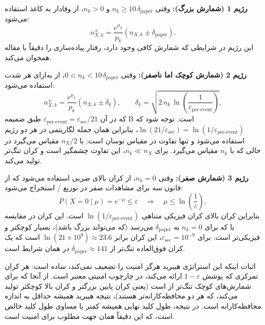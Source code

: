 \textbf{رژیم 1 (شمارش بزرگ):} وقتی $n_k \ge 10\,\delta_{\text{paper}}$ و $n_k > 0$، از  وفادار به کاغذ استفاده می‌شود:
\begin{equation}
	n_{X,k}^{\pm} = \frac{e^{\mu_k}}{p_k}\left(n_{X,k} \pm \delta_{\text{paper}}\right).
\end{equation}
این رژیم در شرایطی که شمارش کافی وجود دارد، رفتار پیاده‌سازی را دقیقاً با مقاله همخوان می‌کند.

\textbf{رژیم 2 (شمارش کوچک اما ناصفر):} وقتی $0 < n_k < 10\,\delta_{\text{paper}}$، از  به‌ازای هر شدت استفاده می‌شود:
\begin{equation}
	n_{X,k}^{\pm} = \frac{e^{\mu_k}}{p_k}\left(n_{X,k} \pm \delta_k\right), \qquad \delta_k = \sqrt{2\,n_k\,\ln\!\left(\frac{1}{\varepsilon_{\text{per-event}}}\right)},
\end{equation}
که در آن $\varepsilon_{\text{per-event}} = \varepsilon_{\text{sec}}/21$ طبق ضمیمه B است. توجه شود که $\ln(21/\varepsilon_{\text{sec}}) = \ln(1/\varepsilon_{\text{per-event}})$، بنابراین همان جمله لگاریتمی در هر دو رژیم استفاده می‌شود و تنها تفاوت در مقیاس نوسان است:  با $n_X/2$ مقیاس می‌گیرد در حالی که  با $n_k$ مقیاس می‌گیرد. برای $n_k \ll n_X$، این تفاوت چشمگیر است و کران تنگ‌تر تولید می‌کند.

\textbf{رژیم 3 (شمارش صفر):} وقتی $n_k = 0$، از کران بالای  ضربی استفاده می‌شود که از قانون سه برای مشاهدات صفر در توزیع / استخراج می‌شود:
\begin{equation}
	P(X = 0 \mid \mu) = e^{-\mu} \le \varepsilon \quad \Rightarrow \quad \mu \le \ln\!\left(\frac{1}{\varepsilon}\right),
\end{equation}
بنابراین کران بالای کران فیزیکی متناهی $\ln(1/\varepsilon_{\text{per-event}})$ است. این کران در مقایسه با  که برای $n_k = 0$ به $\delta_{\text{paper}}$ می‌رسد (که می‌تواند بزرگ باشد)، بسیار کوچکتر و فیزیکی‌تر است. برای $\varepsilon_{\text{sec}} = 10^{-9}$، این کران برابر $\ln(21\times10^9) \approx 23.6$ است که یک کران فوق‌العاده تنگ‌تر از $\delta_{\text{paper}} \approx 141$ در همان شرایط است.

اثبات اینکه این استراتژی هیبرید هرگز امنیت را تضعیف نمی‌کند، ساده است: هر کران تمرکزی که پوشش $1 - \varepsilon$ ارائه می‌کند، در چارچوب امنیتی معتبر است. از آنجا که  برای شمارش‌های کوچک تنگ‌تر از  است (یعنی کران پایین بزرگتر و کران بالا کوچکتر تولید می‌کند، که هر دو محافظه‌کارانه‌تر هستند)، نتیجه هیبرید همیشه حداقل به اندازه  محافظه‌کارانه است. در نتیجه، طول کلید نهایی همیشه کمتر یا مساوی طول کلید  خالص است، که این دقیقاً همان جهت مطلوب برای امنیت است.


